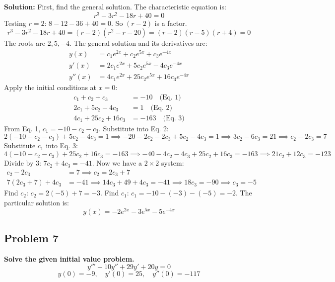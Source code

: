 \documentclass[11pt, a4paper]{article}
\theoremstyle{definition}
\theoremstyle{remark}
\begin{document}
\textbf{Solution:}
First, find the general solution. The characteristic equation is:
\[ r^3 - 3r^2 - 18r + 40 = 0 \]
Testing $r = 2$: $8 - 12 - 36 + 40 = 0$. So $(r - 2)$ is a factor.
\[ r^3 - 3r^2 - 18r + 40 = (r - 2)(r^2 - r - 20) = (r - 2)(r - 5)(r + 4) = 0 \]
The roots are $2, 5, -4$. The general solution and its derivatives are:
\begin{align*}
    y(x) &= c_1 e^{2x} + c_2 e^{5x} + c_3 e^{-4x} \\
    y'(x) &= 2c_1 e^{2x} + 5c_2 e^{5x} - 4c_3 e^{-4x} \\
    y''(x) &= 4c_1 e^{2x} + 25c_2 e^{5x} + 16c_3 e^{-4x}
\end{align*}
Apply the initial conditions at $x = 0$:
\begin{align*}
    c_1 + c_2 + c_3 &= -10 \quad \text{(Eq. 1)} \\
    2c_1 + 5c_2 - 4c_3 &= 1 \quad \text{(Eq. 2)} \\
    4c_1 + 25c_2 + 16c_3 &= -163 \quad \text{(Eq. 3)}
\end{align*}
From Eq. 1, $c_1 = -10 - c_2 - c_3$. Substitute into Eq. 2:
\[ 2(-10 - c_2 - c_3) + 5c_2 - 4c_3 = 1 \implies -20 - 2c_2 - 2c_3 + 5c_2 - 4c_3 = 1 \implies 3c_2 - 6c_3 = 21 \implies c_2 - 2c_3 = 7 \]
Substitute $c_1$ into Eq. 3:
\[ 4(-10 - c_2 - c_3) + 25c_2 + 16c_3 = -163 \implies -40 - 4c_2 - 4c_3 + 25c_2 + 16c_3 = -163 \implies 21c_2 + 12c_3 = -123 \]
Divide by 3: $7c_2 + 4c_3 = -41$.
Now we have a $2 \times 2$ system:
\begin{align*}
    c_2 - 2c_3 &= 7 \implies c_2 = 2c_3 + 7 \\
    7(2c_3 + 7) + 4c_3 &= -41 \implies 14c_3 + 49 + 4c_3 = -41 \implies 18c_3 = -90 \implies c_3 = -5
\end{align*}
Find $c_2$: $c_2 = 2(-5) + 7 = -3$.
Find $c_1$: $c_1 = -10 - (-3) - (-5) = -2$.
The particular solution is:
\[ y(x) = -2e^{2x} - 3e^{5x} - 5e^{-4x} \]

\subsection*{Problem 7}
\textbf{Solve the given initial value problem.}
\[ y''' + 10y'' + 29y' + 20y = 0 \]
\[ y(0) = -9, \quad y'(0) = 25, \quad y''(0) = -117 \]
\end{document}
